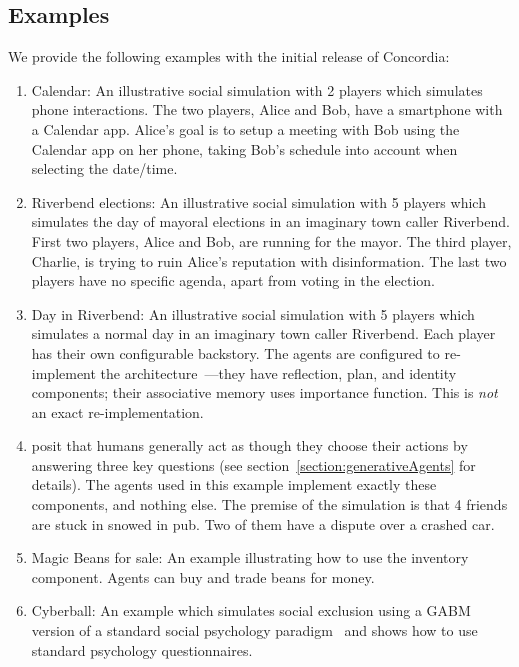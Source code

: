 \documentclass[11pt, a4paper, logo, twocolumn, internal, copyright, numbering]{googledeepmind}
\begin{document}
\subsection{Examples}
\label{sec:examples}
We provide the following examples with the initial release of Concordia:
\begin{enumerate}
    \item Calendar: An illustrative social simulation with 2 players which simulates phone interactions. The two players, Alice and Bob, have a smartphone with a Calendar app. Alice's goal is to setup a meeting with Bob using the Calendar app on her phone, taking Bob's schedule into account when selecting the date/time.
    \item Riverbend elections: An illustrative social simulation with 5 players which simulates the day of mayoral elections in an imaginary town caller Riverbend. First two players, Alice and Bob, are running for the mayor. The third player, Charlie, is trying to ruin Alice's reputation with disinformation. The last two players have no specific agenda, apart from voting in the election.
    \item Day in Riverbend: An illustrative social simulation with 5 players which simulates a normal day in an imaginary town caller Riverbend. Each player has their own configurable backstory. The agents are configured to re-implement the architecture~\cite{park2023generative}---they have reflection, plan, and identity components; their associative memory uses importance function. This is \textit{not} an exact re-implementation.
    \item \cite{march2011logic} posit that humans generally act as though they choose their actions by answering three key questions (see section~\ref{section:generativeAgents} for details). The agents used in this example implement exactly these components, and nothing else. The premise of the simulation is that 4 friends are stuck in snowed in pub. Two of them have a dispute over a crashed car.
    \item Magic Beans for sale: An example illustrating how to use the inventory component. Agents can buy and trade beans for money.
    \item Cyberball: An example which simulates social exclusion using a GABM version of a standard social psychology paradigm~\citep{williams2000cyberostracism} and shows how to use standard psychology questionnaires.
\end{enumerate}


\end{document}
